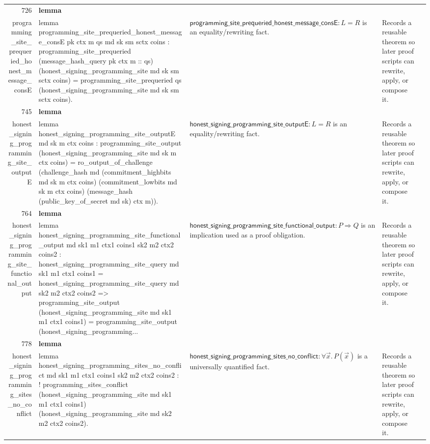 \documentclass[10pt]{article}
\newcommand{\ec}[1]{\begingroup\ttfamily\scriptsize #1\endgroup}
\begin{document}
\begin{longtable}{r L{0.17\textwidth} L{0.26\textwidth} L{0.27\textwidth} L{0.20\textwidth}}
726 & \textbf{lemma}\\\ec{programming\_site\_prequeried\_honest\_message\_consE} & \ec{lemma programming\_site\_prequeried\_honest\_message\_consE pk ctx m qs md sk sm sctx coins : programming\_site\_prequeried (message\_hash\_query pk ctx m :: qs) (honest\_signing\_programming\_site md sk sm sctx coins) = programming\_site\_prequeried qs (honest\_signing\_programming\_site md sk sm sctx coins).} & \(\mathsf{programming\_site\_prequeried\_honest\_message\_consE} : L = R\) is an equality/rewriting fact. & Records a reusable theorem so later proof scripts can rewrite, apply, or compose it. \\
745 & \textbf{lemma}\\\ec{honest\_signing\_programming\_site\_outputE} & \ec{lemma honest\_signing\_programming\_site\_outputE md sk m ctx coins : programming\_site\_output (honest\_signing\_programming\_site md sk m ctx coins) = ro\_output\_of\_challenge (challenge\_hash md (commitment\_highbits md sk m ctx coins) (commitment\_lowbits md sk m ctx coins) (message\_hash (public\_key\_of\_secret md sk) ctx m)).} & \(\mathsf{honest\_signing\_programming\_site\_outputE} : L = R\) is an equality/rewriting fact. & Records a reusable theorem so later proof scripts can rewrite, apply, or compose it. \\
764 & \textbf{lemma}\\\ec{honest\_signing\_programming\_site\_functional\_output} & \ec{lemma honest\_signing\_programming\_site\_functional\_output md sk1 m1 ctx1 coins1 sk2 m2 ctx2 coins2 : honest\_signing\_programming\_site\_query md sk1 m1 ctx1 coins1 = honest\_signing\_programming\_site\_query md sk2 m2 ctx2 coins2 => programming\_site\_output (honest\_signing\_programming\_site md sk1 m1 ctx1 coins1) = programming\_site\_output (honest\_signing\_programming...} & \(\mathsf{honest\_signing\_programming\_site\_functional\_output} : P \Rightarrow Q\) is an implication used as a proof obligation. & Records a reusable theorem so later proof scripts can rewrite, apply, or compose it. \\
778 & \textbf{lemma}\\\ec{honest\_signing\_programming\_sites\_no\_conflict} & \ec{lemma honest\_signing\_programming\_sites\_no\_conflict md sk1 m1 ctx1 coins1 sk2 m2 ctx2 coins2 : ! programming\_sites\_conflict (honest\_signing\_programming\_site md sk1 m1 ctx1 coins1) (honest\_signing\_programming\_site md sk2 m2 ctx2 coins2).} & \(\mathsf{honest\_signing\_programming\_sites\_no\_conflict} : \forall \vec{x}.\, P(\vec{x})\) is a universally quantified fact. & Records a reusable theorem so later proof scripts can rewrite, apply, or compose it. \\

\end{longtable}
\end{document}

